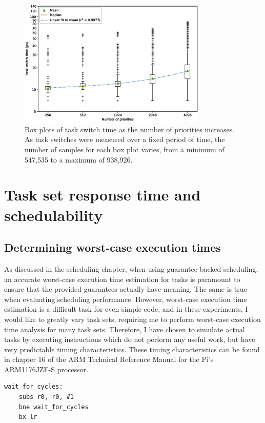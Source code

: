 \documentclass[twoside]{uva-inf-bachelor-thesis}
\begin{document}
\begin{figure}[htpb]
    \centering
    \includegraphics[width=0.8\textwidth]{boxplot.eps}
    \caption{Box plots of task switch time as the number of priorities increases. As task switches were measured over a fixed period of time, the number of samples for each box plot varies, from a minimum of 547,535 to a maximum of 938,926.}
    \label{fig:prioboxplot}
\end{figure}

\section{Task set response time and schedulability}
\subsection{Determining worst-case execution times}
As discussed in the scheduling chapter, when using guarantee-backed scheduling, an accurate worst-case execution time estimation for tasks is paramount to ensure that the provided guarantees actually have meaning. The same is true when evaluating scheduling performance. However, worst-case execution time estimation is a difficult task for even simple code, and in these experiments, I would like to greatly vary task sets, requiring me to perform worst-case execution time analysis for many task sets. Therefore, I have chosen to simulate actual tasks by executing instructions which do not perform any useful work, but have very predictable timing characteristics. These timing characteristics can be found in chapter 16 of the ARM Technical Reference Manual for the Pi's ARM1176JZF-S processor\cite{arm:arm1176}.

\begin{lstlisting}
wait_for_cycles:
    subs r0, r0, #1
    bne wait_for_cycles
    bx lr
\end{lstlisting}
\end{document}
